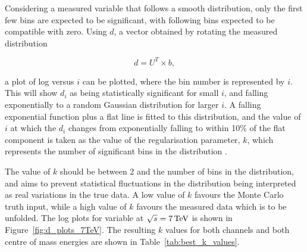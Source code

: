 Considering a measured variable that follows a smooth distribution, %
only the first few bins are expected to be significant, with following bins expected to be compatible with
zero. Using $d$, a vector obtained by rotating the measured distribution

\begin{equation}
d = U^{T}\times{b},
\label{eq:d}
\end{equation}

a plot of log versus $i$ can be plotted, where the bin number
is represented by $i$. This will show $d_{i}$ as being statistically significant for small $i$, and falling exponentially to a random Gaussian
distribution for larger $i$. A falling exponential function plus a flat line is fitted to this distribution,
and the value of $i$ at which the $d_{i}$ changes from exponentially falling to within 10\% of the flat
component is taken as the value of the regularisation parameter, $k$, which represents the number of
significant bins in the distribution \cite{Hocker:1995kb}.

The value of $k$ should be between 2 and the number of bins in the distribution, and aims to prevent
statistical fluctuations in the distribution being interpreted as real variations in the true data. A low
value of $k$ favours the Monte Carlo truth input, while a high value of $k$ favours the measured data which is
to be unfolded. The log plots for \met variable at $\sqrt{s}=7\,\text{Te\hspace{-.08em}V}$ is shown in
Figure~\ref{fig:d_plots_7TeV}. The resulting $k$ values for both channels and both centre of mass energies are
shown in Table~\ref{tab:best_k_values}.

